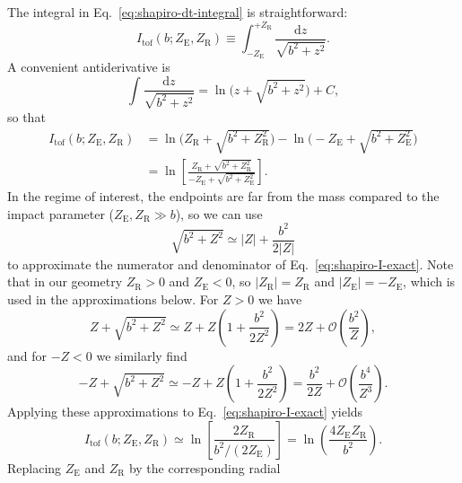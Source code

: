 \documentclass[11pt]{article}
\begin{document}
The integral in Eq.~\eqref{eq:shapiro-dt-integral} is straightforward:
\begin{equation}
  I_\mathrm{tof}(b; Z_\mathrm{E}, Z_\mathrm{R})
  \equiv \int_{-Z_\mathrm{E}}^{+Z_\mathrm{R}}
         \frac{\mathrm{d}z}{\sqrt{b^2 + z^2}}.
\end{equation}
A convenient antiderivative is
\begin{equation}
  \int \frac{\mathrm{d}z}{\sqrt{b^2 + z^2}}
  = \ln\!\bigl(z + \sqrt{b^2 + z^2}\bigr) + C,
\end{equation}
so that
\begin{align}
  I_\mathrm{tof}(b; Z_\mathrm{E}, Z_\mathrm{R})
  &= \ln\!\bigl(Z_\mathrm{R} + \sqrt{b^2 + Z_\mathrm{R}^2}\bigr)
   - \ln\!\bigl(-Z_\mathrm{E} + \sqrt{b^2 + Z_\mathrm{E}^2}\bigr)
  \nonumber\\[0.5ex]
  &= \ln\!\left[
       \frac{Z_\mathrm{R} + \sqrt{b^2 + Z_\mathrm{R}^2}}
            {-Z_\mathrm{E} + \sqrt{b^2 + Z_\mathrm{E}^2}}
     \right].
  \label{eq:shapiro-I-exact}
\end{align}
In the regime of interest, the endpoints are far from the mass compared to
the impact parameter ($Z_\mathrm{E}, Z_\mathrm{R} \gg b$), so we can use
\begin{equation}
  \sqrt{b^2 + Z^2} \simeq |Z| + \frac{b^2}{2|Z|}
\end{equation}
to approximate the numerator and denominator of Eq.~\eqref{eq:shapiro-I-exact}.
Note that in our geometry $Z_\mathrm{R} > 0$ and $Z_\mathrm{E} < 0$, so
$|Z_\mathrm{R}| = Z_\mathrm{R}$ and $|Z_\mathrm{E}| = -Z_\mathrm{E}$, which
is used in the approximations below.
For $Z>0$ we have
\begin{equation}
  Z + \sqrt{b^2 + Z^2}
  \simeq Z + Z\left(1 + \frac{b^2}{2Z^2}\right)
  = 2Z + \mathcal{O}\!\left(\frac{b^2}{Z}\right),
\end{equation}
and for $-Z<0$ we similarly find
\begin{equation}
  -Z + \sqrt{b^2 + Z^2}
  \simeq -Z + Z\left(1 + \frac{b^2}{2Z^2}\right)
  = \frac{b^2}{2Z} + \mathcal{O}\!\left(\frac{b^4}{Z^3}\right).
\end{equation}
Applying these approximations to Eq.~\eqref{eq:shapiro-I-exact} yields
\begin{equation}
  I_\mathrm{tof}(b; Z_\mathrm{E}, Z_\mathrm{R})
  \simeq \ln\!\left[
           \frac{2Z_\mathrm{R}}{b^2/(2Z_\mathrm{E})}
         \right]
  = \ln\!\left(\frac{4 Z_\mathrm{E} Z_\mathrm{R}}{b^2}\right).
\end{equation}
Replacing $Z_\mathrm{E}$ and $Z_\mathrm{R}$ by the corresponding radial
\end{document}
